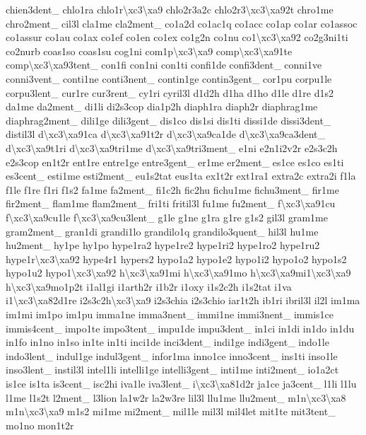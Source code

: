 {chien3dent\-\_\- chlo1ra chlo1r\textbackslash{}xc3\textbackslash{}xa9 chlo2r3a2c chlo2r3\textbackslash{}xc3\textbackslash{}xa92t chro1me chro2ment\-\_\- cil3l cla1me cla2ment\-\_\- co1a2d co1ac1q co1acc co1ap co1ar co1assoc co1assur co1au co1ax co1ef co1en co1ex co1g2n co1nu co1\textbackslash{}xc3\textbackslash{}xa92 co2g3ni1ti co2nurb coas1so coas1su cog1ni com1p\textbackslash{}xc3\textbackslash{}xa9 comp\textbackslash{}xc3\textbackslash{}xa91te comp\textbackslash{}xc3\textbackslash{}xa93tent\-\_\- con1fi con1ni con1ti confi1de confi3dent\-\_\- conni1ve conni3vent\-\_\- conti1ne conti3nent\-\_\- contin1ge contin3gent\-\_\- cor1pu corpu1le corpu3lent\-\_\- cur1re cur3rent\-\_\- cy1ri cyril3l d1d2h d1ha d1ho d1le d1re d1s2 da1me da2ment\-\_\- di1li di2s3cop dia1p2h diaph1ra diaph2r diaphrag1me diaphrag2ment\-\_\- dili1ge dili3gent\-\_\- dis1co dis1si dis1ti dissi1de dissi3dent\-\_\- distil3l d\textbackslash{}xc3\textbackslash{}xa91ca d\textbackslash{}xc3\textbackslash{}xa91t2r d\textbackslash{}xc3\textbackslash{}xa9ca1de d\textbackslash{}xc3\textbackslash{}xa9ca3dent\-\_\- d\textbackslash{}xc3\textbackslash{}xa9t1ri d\textbackslash{}xc3\textbackslash{}xa9tri1me d\textbackslash{}xc3\textbackslash{}xa9tri3ment\-\_\- e1ni e2n1i2v2r e2s3c2h e2s3cop en1t2r ent1re entre1ge entre3gent\-\_\- er1me er2ment\-\_\- es1ce es1co es1ti es3cent\-\_\- esti1me esti2ment\-\_\- eu1s2tat eus1ta ex1t2r ext1ra1 extra2c extra2i f1la f1le f1re f1ri f1s2 fa1me fa2ment\-\_\- fi1c2h fic2hu fichu1me fichu3ment\-\_\- fir1me fir2ment\-\_\- flam1me flam2ment\-\_\- fri1ti fritil3l fu1me fu2ment\-\_\- f\textbackslash{}xc3\textbackslash{}xa91cu f\textbackslash{}xc3\textbackslash{}xa9cu1le f\textbackslash{}xc3\textbackslash{}xa9cu3lent\-\_\- g1le g1ne g1ra g1re g1s2 gil3l gram1me gram2ment\-\_\- gran1di grandi1lo grandilo1q grandilo3quent\-\_\- hil3l hu1me hu2ment\-\_\- hy1pe hy1po hype1ra2 hype1re2 hype1ri2 hype1ro2 hype1ru2 hype1r\textbackslash{}xc3\textbackslash{}xa92 hype4r1 hypers2 hypo1a2 hypo1e2 hypo1i2 hypo1o2 hypo1s2 hypo1u2 hypo1\textbackslash{}xc3\textbackslash{}xa92 h\textbackslash{}xc3\textbackslash{}xa91mi h\textbackslash{}xc3\textbackslash{}xa91mo h\textbackslash{}xc3\textbackslash{}xa9mi1\textbackslash{}xc3\textbackslash{}xa9 h\textbackslash{}xc3\textbackslash{}xa9mo1p2t i1al1gi i1arth2r i1b2r i1oxy i1s2c2h i1s2tat i1va i1\textbackslash{}xc3\textbackslash{}xa82d1re i2s3c2h\textbackslash{}xc3\textbackslash{}xa9 i2s3chia i2s3chio iar1t2h ib1ri ibril3l il2l im1ma im1mi im1po im1pu imma1ne imma3nent\-\_\- immi1ne immi3nent\-\_\- immis1ce immis4cent\-\_\- impo1te impo3tent\-\_\- impu1de impu3dent\-\_\- in1ci in1di in1do in1du in1fo in1no in1so in1te in1ti inci1de inci3dent\-\_\- indi1ge indi3gent\-\_\- indo1le indo3lent\-\_\- indul1ge indul3gent\-\_\- infor1ma inno1ce inno3cent\-\_\- ins1ti inso1le inso3lent\-\_\- instil3l intel1li intelli1ge intelli3gent\-\_\- inti1me inti2ment\-\_\- io1a2ct is1ce is1ta is3cent\-\_\- isc2hi iva1le iva3lent\-\_\- i\textbackslash{}xc3\textbackslash{}xa81d2r ja1ce ja3cent\-\_\- l1li l1lu l1me l1s2t l2ment\-\_\- l3lion la1w2r la2w3re lil3l llu1me llu2ment\-\_\- m1n\textbackslash{}xc3\textbackslash{}xa8 m1n\textbackslash{}xc3\textbackslash{}xa9 m1s2 mi1me mi2ment\-\_\- mil1le mil3l mil4let mit1te mit3tent\-\_\- mo1no mon1t2r }
